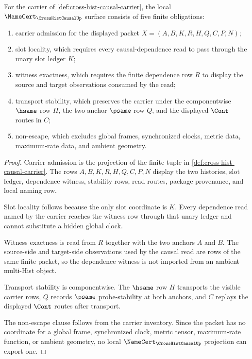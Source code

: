 \begin{theorem}
\label{thm:cross-hist-causal-namecert-obligations}
For the carrier of \autoref{def:cross-hist-causal-carrier}, the local $\NameCert_{\CrossHistCausalUp}$ surface consists of five finite obligations:
\begin{enumerate}
\item carrier admission for the displayed packet $X=(A,B,K,R,H,Q,C,P,N)$;
\item slot locality, which requires every causal-dependence read to pass through the unary slot ledger $K$;
\item witness exactness, which requires the finite dependence row $R$ to display the source and target observations consumed by the read;
\item transport stability, which preserves the carrier under the componentwise $\hsame$ row $H$, the two-anchor $\psame$ row $Q$, and the displayed $\Cont$ routes in $C$;
\item non-escape, which excludes global frames, synchronized clocks, metric data, maximum-rate data, and ambient geometry.
\end{enumerate}
\end{theorem}
\begin{proof}
Carrier admission is the projection of the finite tuple in \autoref{def:cross-hist-causal-carrier}. The rows $A,B,K,R,H,Q,C,P,N$ display the two histories, slot ledger, dependence witness, stability rows, read routes, package provenance, and local naming row.

Slot locality follows because the only slot coordinate is $K$. Every dependence read named by the carrier reaches the witness row through that unary ledger and cannot substitute a hidden global clock.

Witness exactness is read from $R$ together with the two anchors $A$ and $B$. The source-side and target-side observations used by the causal read are rows of the same finite packet, so the dependence witness is not imported from an ambient multi-Hist object.

Transport stability is componentwise. The $\hsame$ row $H$ transports the visible carrier rows, $Q$ records $\psame$ probe-stability at both anchors, and $C$ replays the displayed $\Cont$ routes after transport.

The non-escape clause follows from the carrier inventory. Since the packet has no coordinate for a global frame, synchronized clock, metric tensor, maximum-rate function, or ambient geometry, no local $\NameCert_{\CrossHistCausalUp}$ projection can export one.
\end{proof}

